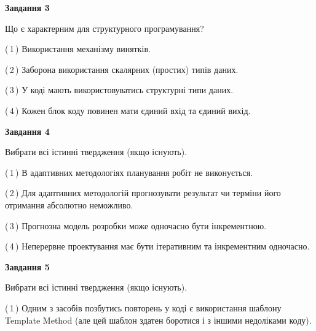 \documentclass[10pt, ukrainian]{article}
\begin{document}
{\begin {large}
{\begin {center}\textbf{Завдання 3}\end {center}}\par
Що є характерним для структурного програмування?\par
\vspace{2mm}



(\,1\,) Використання механізму винятків. %



(\,2\,) Заборона використання скалярних (простих) типів даних. %



(\,3\,) У коді мають використовуватись структурні типи даних. %



(\,4\,) Кожен блок коду повинен мати єдиний вхід та єдиний вихід.%


{\begin {center}\textbf{Завдання 4}\end {center}}\par
Вибрати всі істинні твердження (якщо існують).\par
\vspace{2mm}



(\,1\,) В адаптивних методологіях планування робіт не виконується. %



(\,2\,) Для адаптивних методологій прогнозувати результат чи терміни його отримання абсолютно неможливо. %



(\,3\,) Прогнозна модель розробки може одночасно бути інкрементною. %



(\,4\,) Неперервне проектування має бути ітеративним та інкрементним одночасно. %


{\begin {center}\textbf{Завдання 5}\end {center}}\par
Вибрати всі істинні твердження (якщо існують).\par
\vspace{2mm}



(\,1\,) Одним з засобів позбутись повторень у коді є використання шаблону Template Method (але цей шаблон здатен боротися і з іншими недоліками коду). %




\end{large}}
\end{document}
